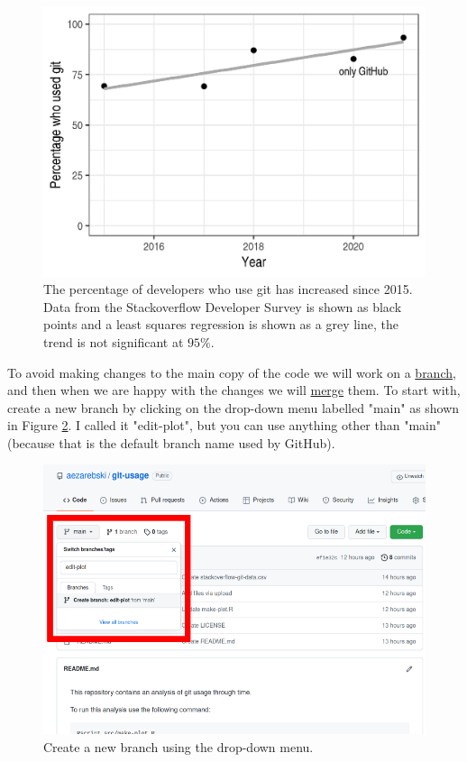\documentclass[11pt,onecolumn]{scrartcl}
\begin{document}
\begin{figure}[htbp]
\centering
\includegraphics[width=.9\linewidth]{./git-usage-2.png}
\caption{\label{fig:demo-result-2}The percentage of developers who use git has increased since 2015. Data from the Stackoverflow Developer Survey is shown as black points and a least squares regression is shown as a grey line, the trend is not significant at \(95\%\).}
\end{figure}

To avoid making changes to the main copy of the code we will work on a \hyperref[sec:orgf360103]{branch},
and then when we are happy with the changes we will \hyperref[sec:org1b8d383]{merge} them. To start with,
create a new branch by clicking on the drop-down menu labelled "main" as shown
in Figure \ref{fig:create-new-branch}. I called it "edit-plot", but you can use
anything other than "main" (because that is the default branch name used by
GitHub).

\begin{figure}[htbp]
\centering
\includegraphics[width=.9\linewidth]{./create-new-branch.png}
\caption{\label{fig:create-new-branch}Create a new branch using the drop-down menu.}
\end{figure}
\end{document}
